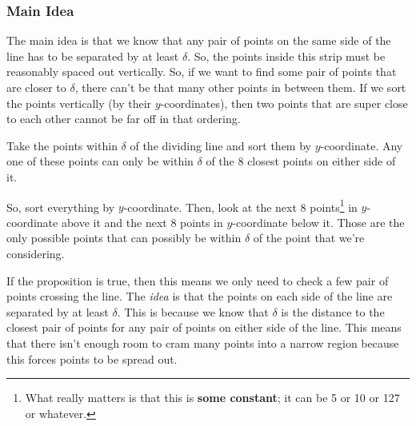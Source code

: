 \documentclass[letterpaper]{article}
\begin{document}
\subsubsection{Main Idea}
The main idea is that we know that any pair of points on the same side of the line has to be separated by at least $\delta$. So, the points inside this strip must be reasonably spaced out vertically. So, if we want to find some pair of points that are closer to $\delta$, there can't be that many other points in between them. If we sort the points vertically (by their $y$-coordinates), then two points that are super close to each other cannot be far off in that ordering. 
\begin{proposition}
    Take the points within $\delta$ of the dividing line and sort them by $y$-coordinate. Any one of these points can only be within $\delta$ of the 8 closest points on either side of it. 
\end{proposition}
So, sort everything by $y$-coordinate. Then, look at the next 8 points\footnote{What really matters is that this is \textbf{some constant}; it can be 5 or 10 or 127 or whatever.} in $y$-coordinate above it and the next 8 points in $y$-coordinate below it. Those are the only possible points that can possibly be within $\delta$ of the point that we're considering. 

\bigskip 

If the proposition is true, then this means we only need to check a few pair of points crossing the line. The \emph{idea} is that the points on each side of the line are separated by at least $\delta$. This is because we know that $\delta$ is the distance to the closest pair of points for any pair of points on either side of the line. This means that there isn't enough room to cram many points into a narrow region because this forces points to be spread out. 
\end{document}
